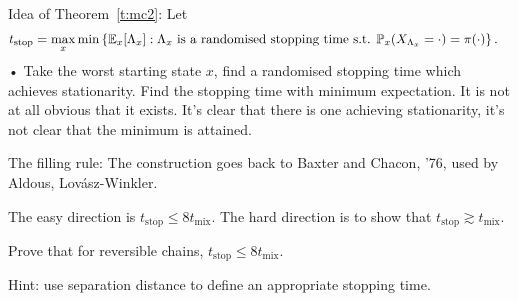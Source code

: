 Idea of Theorem~\ref{t:mc2}: Let 
\begin{align*}
t_{\text{stop}} &= \max_x\min \left\{{\mathbb{E}_x[\Lambda_x]}:{\Lambda_x \text{ is a randomised stopping time s.t. }\mathbb{P}_x(X_{\Lambda_x}=\cdot)=\pi(\cdot)}\right\}.
\end{align*}•
Take the worst starting state $x$, find a randomised stopping time which achieves stationarity. Find the stopping time with minimum expectation. It is not at all obvious that it exists. It's clear that there is one achieving stationarity, it's not clear that the minimum is attained.

The filling rule: The construction goes back to Baxter and Chacon, '76, used by Aldous, Lov\'asz-Winkler. 

The easy direction is $t_{\text{stop}}\le 8t_{\text{mix}}$. The hard direction is to show that $t_{\text{stop}}\gtrsim t_{\text{mix}}$. 
\begin{exr}
Prove that for reversible chains, $t_{\text{stop}}\le 8t_{\text{mix}}$. 

Hint: use separation distance to define an appropriate stopping time.
\end{exr}
